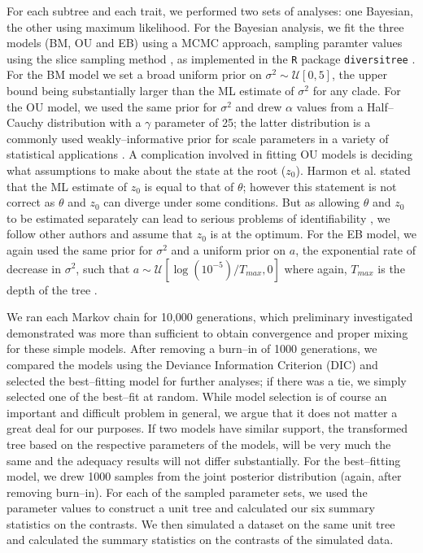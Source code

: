 \documentclass[a4paper,12pt]{article}
\begin{document}
For each subtree and each trait, we performed two sets of analyses: one Bayesian, the other using maximum likelihood. For the Bayesian analysis, we fit the three models (BM, OU and EB) using a MCMC approach, sampling paramter values using the slice sampling method \citep{Nealslice}, as implemented in the \texttt{R} package \texttt{diversitree} \citep{FitzJohn2012}. For the BM model we set a broad uniform prior on $\sigma^2 \sim \mathcal{U}[0, 5]$, the upper bound being substantially larger than the ML estimate of $\sigma^2$ for any clade. For the OU model, we used the same prior for $\sigma^2$ and drew $\alpha$ values from a Half--Cauchy distribution with a $\gamma$ parameter of 25; the latter distribution is a commonly used weakly--informative prior for scale parameters in a variety of statistical applications \citep{Gelmanprior, Polson2012}. A complication involved in fitting OU models is deciding what assumptions to make about the state at the root ($z_0$). Harmon et al. \citep{Harmon2010} stated that the ML estimate of $z_0$ is equal to that of $\theta$; however this statement is not correct as $\theta$ and $z_0$ can diverge under some conditions. But as allowing $\theta$ and $z_0$ to be estimated separately can lead to serious problems of identifiability \citep{HoAne2012}, we follow other authors \citep{Labra2009, Beaulieu2012} and assume that $z_0$ is at the optimum. For the EB model, we again used the same prior for $\sigma^2$ and a uniform prior on $a$, the exponential rate of decrease in $\sigma^2$, such that $a \sim \mathcal{U}[\log (10^{-5})/T_{max}, 0]$ where again, $T_{max}$ is the depth of the tree \citep{SlaterPennell}.

We ran each Markov chain for 10,000 generations, which preliminary investigated demonstrated was more than sufficient to obtain convergence and proper mixing for these simple models. After removing a burn--in of 1000 generations, we compared the models using the Deviance Information Criterion (DIC) \citep{dic} and selected the best--fitting model for further analyses; if there was a tie, we simply selected one of the best--fit at random. While model selection is of course an important and difficult problem in general, we argue that it does not matter a great deal for our purposes. If two models have similar support, the transformed tree based on the respective parameters of the models, will be very much the same and the adequacy results will not differ substantially. For the best--fitting model, we drew 1000 samples from the joint posterior distribution (again, after removing burn--in). For each of the sampled parameter sets, we used the parameter values to construct a unit tree and calculated our six summary statistics on the contrasts. We then simulated a dataset on the same unit tree and calculated the summary statistics on the contrasts of the simulated data.
 
\end{document}
